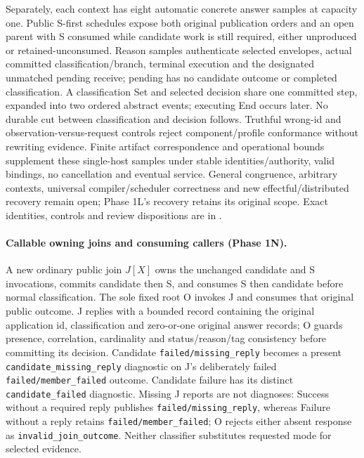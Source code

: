 \documentclass[11pt,a4paper]{article}
\theoremstyle{definition}
\theoremstyle{remark}
\begin{document}
Separately, each context has eight automatic concrete answer samples at capacity one. Public S-first schedules expose both original publication orders and an open parent with S consumed while candidate work is still required, either unproduced or retained-unconsumed. Reason samples authenticate selected envelopes, actual committed classification/branch, terminal execution and the designated unmatched pending receive; pending has no candidate outcome or completed classification. A classification Set and selected decision share one committed step, expanded into two ordered abstract events; executing End occurs later. No durable cut between classification and decision follows. Truthful wrong-id and observation-versus-request controls reject component/profile conformance without rewriting evidence. Finite artifact correspondence and operational bounds supplement these single-host samples under stable identities/authority, valid bindings, no cancellation and eventual service. General congruence, arbitrary contexts, universal compiler/scheduler correctness and new effectful/distributed recovery remain open; Phase 1L's recovery retains its original scope. Exact identities, controls and review dispositions are in .

\paragraph{Callable owning joins and consuming callers (Phase 1N).} A new ordinary public join $J[X]$ owns the unchanged candidate and S invocations, commits candidate then S, and consumes S then candidate before normal classification. The sole fixed root O invokes J and consumes that original public outcome. J replies with a bounded record containing the original application id, classification and zero-or-one original answer records; O guards presence, correlation, cardinality and status/reason/tag consistency before committing its decision. Candidate \texttt{failed/missing\_reply} becomes a present \texttt{candidate\_missing\_reply} diagnostic on J's deliberately failed \texttt{failed/member\_failed} outcome. Candidate failure has its distinct \texttt{candidate\_failed} diagnostic. Missing J reports are not diagnoses: Success without a required reply publishes \texttt{failed/missing\_reply}, whereas Failure without a reply retains \texttt{failed/member\_failed}; O rejects either absent response as \texttt{invalid\_join\_outcome}. Neither classifier substitutes requested mode for selected evidence.
\end{document}
